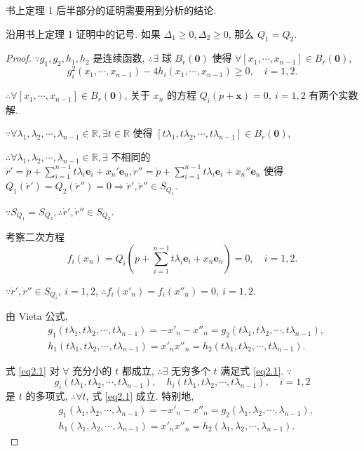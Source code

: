 \documentclass[color=black,device=normal,lang=cn,mode=geye]{elegantnote}
\begin{document}
书上定理 1 后半部分的证明需要用到分析的结论.
\begin{theorem}
    沿用书上定理 1 证明中的记号. 如果 $\Delta_1\geq0,\Delta_2\geq0$, 那么 $Q_1=Q_2$.
\end{theorem}
\begin{proof}
    $\because g_1,g_2,h_1,h_2$ 是连续函数, $\therefore\exists$ 球 $B_r(\boldsymbol{0})$ 使得 $\forall[x_1,\cdots,x_{n-1}]\in B_r(\boldsymbol{0})$,
    \[g_i^2(x_1,\cdots,x_{n-1})-4h_i(x_1,\cdots,x_{n-1})\geq0,\quad i=1,2.\]

    $\therefore\forall[x_1,\cdots,x_{n-1}]\in B_r(\boldsymbol{0})$, 关于 $x_n$ 的方程 $Q_i(\dot{p}+\boldsymbol{x})=0,\ i=1,2$ 有两个实数解.

    $\because\forall\lambda_1,\lambda_2,\cdots,\lambda_{n-1}\in\mathbb{R},\exists t\in\mathbb{R}$ 使得 $[t\lambda_1,t\lambda_2,\cdots,t\lambda_{n-1}]\in B_r(\boldsymbol{0})$,
    
    $\therefore\forall\lambda_1,\lambda_2,\cdots,\lambda_{n-1}\in\mathbb{R},\exists$ 不相同的 $\dot{r}'=\dot{p}+\sum\limits_{i=1}^{n-1}t\lambda_i\boldsymbol{e}_i+x_n'\boldsymbol{e}_n,\dot{r}''=\dot{p}+\sum\limits_{i=1}^{n-1}t\lambda_i\boldsymbol{e}_i+x_n''\boldsymbol{e}_n$ 使得 $Q_1(\dot{r}')=Q_2(\dot{r}'')=0\Rightarrow\dot{r}',\dot{r}''\in S_{Q_1}$.

    $\because S_{Q_1}=S_{Q_2},\therefore\dot{r}',\dot{r}''\in S_{Q_2}$.

    考察二次方程
    \[f_i(x_n)=Q_i\left(\dot{p}+\sum\limits_{i=1}^{n-1}t\lambda_i\boldsymbol{e}_i+x_n\boldsymbol{e}_n\right)=0,\quad i=1,2.\]

    $\because\dot{r}',\dot{r}''\in S_{Q_i},\ i=1,2$, $\therefore f_i(x'_n)=f_i(x''_n)=0,\ i=1,2$.

    由 Vieta 公式,
    \begin{equation}\label{eq2.1}
        \begin{aligned}
            & g_1(t\lambda_1,t\lambda_2,\cdots,t\lambda_{n-1})=-x'_n-x''_n=g_2(t\lambda_1,t\lambda_2,\cdots,t\lambda_{n-1}), \\
            & h_1(t\lambda_1,t\lambda_2,\cdots,t\lambda_{n-1})=x'_nx''_n=h_2(t\lambda_1,t\lambda_2,\cdots,t\lambda_{n-1}).
        \end{aligned}
    \end{equation}

    式 \ref{eq2.1} 对 $\forall$ 充分小的 $t$ 都成立, $\therefore\exists$ 无穷多个 $t$ 满足式 \ref{eq2.1}. $\because$
    \[g_i(t\lambda_1,t\lambda_2,\cdots,t\lambda_{n-1}),\quad h_i(t\lambda_1,t\lambda_2,\cdots,t\lambda_{n-1}),\quad i=1,2\]
    是 $t$ 的多项式, $\therefore\forall t$, 式 \ref{eq2.1} 成立. 特别地,
    \begin{equation}\label{eq2.2}
        \begin{aligned}
            & g_1(\lambda_1,\lambda_2,\cdots,\lambda_{n-1})=-x'_n-x''_n=g_2(\lambda_1,\lambda_2,\cdots,\lambda_{n-1}), \\
            & h_1(\lambda_1,\lambda_2,\cdots,\lambda_{n-1})=x'_nx''_n=h_2(\lambda_1,\lambda_2,\cdots,\lambda_{n-1}).
        \end{aligned}
    \end{equation}


\end{proof}
\end{document}
